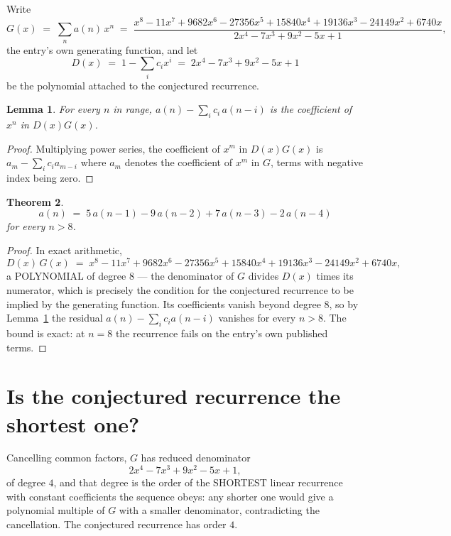 \documentclass[11pt,a4paper]{article}
\theoremstyle{plain}
\newtheorem{theorem}{Theorem}
\newtheorem{lemma}[theorem]{Lemma}
\theoremstyle{definition}
\begin{document}
Write
\[
G(x)\;=\;\sum_{n}a(n)\,x^{n}\;=\;\frac{x^{8} - 11 x^{7} + 9682 x^{6} - 27356 x^{5} + 15840 x^{4} + 19136 x^{3} - 24149 x^{2} + 6740 x}{2 x^{4} - 7 x^{3} + 9 x^{2} - 5 x + 1},
\]
the entry's own generating function, and let
\[
D(x)\;=\;1-\sum_i c_i x^{i}\;=\;2 x^{4} - 7 x^{3} + 9 x^{2} - 5 x + 1
\]
be the polynomial attached to the conjectured recurrence.

\begin{lemma}\label{lem:key}
For every $n$ in range, $a(n)-\sum_i c_i\,a(n-i)$ is the coefficient of $x^{n}$ in
$D(x)G(x)$.
\end{lemma}

\begin{proof}
Multiplying power series, the coefficient of $x^{m}$ in $D(x)G(x)$ is
$a_m-\sum_i c_i a_{m-i}$ where $a_m$ denotes the coefficient of $x^{m}$ in $G$, terms with
negative index being zero.
\end{proof}

\begin{theorem}
\[
a(n)\;=\;5\,a(n-1) - 9\,a(n-2) + 7\,a(n-3) - 2\,a(n-4)
\]
for every $n>8$.
\end{theorem}

\begin{proof}
In exact arithmetic,
\[
D(x)\,G(x)\;=\;x^{8} - 11 x^{7} + 9682 x^{6} - 27356 x^{5} + 15840 x^{4} + 19136 x^{3} - 24149 x^{2} + 6740 x,
\]
a POLYNOMIAL of degree $8$ --- the denominator of $G$ divides $D(x)$ times its numerator,
which is precisely the condition for the conjectured recurrence to be implied by the
generating function. Its coefficients vanish beyond degree $8$, so by
Lemma~\ref{lem:key} the residual $a(n)-\sum_ic_ia(n-i)$ vanishes for every
$n>8$. The bound is exact: at $n=8$ the recurrence fails on the entry's own published terms.
\end{proof}

\section{Is the conjectured recurrence the shortest one?}

Cancelling common factors, $G$ has reduced denominator
\[
2 x^{4} - 7 x^{3} + 9 x^{2} - 5 x + 1,
\]
of degree $4$, and that degree is the order of the SHORTEST linear recurrence with
constant coefficients the sequence obeys: any shorter one would give a polynomial multiple of
$G$ with a smaller denominator, contradicting the cancellation. The conjectured recurrence has
order $4$.
\end{document}
